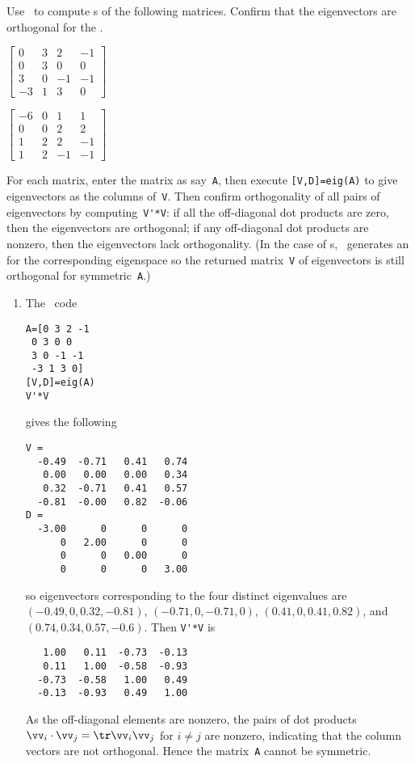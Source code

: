 


\begin{example} \label{eg:4x4orthevec}
Use \script\ to compute s of the following matrices.
Confirm that the eigenvectors are orthogonal for the .
\begin{Parts}
\item \(\begin{bmatrix} 0 & 3 & 2 & -1
\\ 0 & 3 & 0 & 0
\\ 3 & 0 & -1 & -1
\\ -3 & 1 & 3 & 0 \end{bmatrix}\)
  
\item \(\begin{bmatrix} -6 & 0 & 1 & 1
\\ 0 & 0 & 2 & 2
\\ 1 & 2 & 2 & -1
\\ 1 & 2 & -1 & -1 \end{bmatrix}\)
\end{Parts}
\begin{solution} 
For each matrix, enter the matrix as say~\verb|A|, then execute \verb|[V,D]=eig(A)| to give eigenvectors as the columns of~\verb|V|. 
Then confirm orthogonality of all pairs of eigenvectors by computing~\verb|V'*V|: if all the off-diagonal dot products are zero, then the eigenvectors are orthogonal; if any off-diagonal dot products are nonzero, then the eigenvectors lack orthogonality.
(In the case of s, \script\ generates an  for the corresponding eigenspace so the returned matrix~\verb|V| of eigenvectors is still orthogonal for symmetric~\verb|A|.)
\begin{enumerate}
\item The \script\ code 
\setbox\ajrqrbox\hbox{}%
\marginajrbox%
\begin{verbatim}
A=[0 3 2 -1
 0 3 0 0
 3 0 -1 -1
 -3 1 3 0]
[V,D]=eig(A)
V'*V
\end{verbatim}
gives the following \twodp
\begin{verbatim}
V =
  -0.49  -0.71   0.41   0.74
   0.00   0.00   0.00   0.34
   0.32  -0.71   0.41   0.57
  -0.81  -0.00   0.82  -0.06
D =
  -3.00      0      0      0
      0   2.00      0      0
      0      0   0.00      0
      0      0      0   3.00
\end{verbatim}
so eigenvectors corresponding to the four distinct eigenvalues are
\sloppy
\((-0.49,0,0.32,-0.81)\), \((-0.71,0,-0.71,0)\), \((0.41,0,0.41,0.82)\), and \((0.74,0.34,0.57,-0.6)\).
Then \verb|V'*V| is \twodp
\begin{verbatim}
   1.00   0.11  -0.73  -0.13
   0.11   1.00  -0.58  -0.93
  -0.73  -0.58   1.00   0.49
  -0.13  -0.93   0.49   1.00
\end{verbatim}
As the off-diagonal elements are nonzero,  the pairs of dot products \(\vv_i\cdot\vv_j=\tr \vv_i\vv_j\) for \(i\neq j\) are nonzero, indicating that the column vectors are not orthogonal.  
Hence the matrix~\verb|A| cannot be symmetric.


\end{enumerate}
\end{solution}
\end{example}

